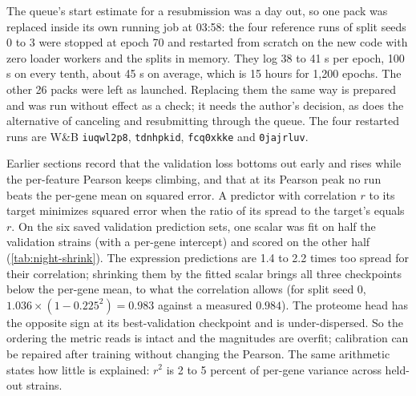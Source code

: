  The queue's start estimate for a resubmission was a day
out, so one pack was replaced inside its own running job at 03:58: the four reference runs
of split seeds 0 to 3 were stopped at epoch 70 and restarted from scratch on the new code
with zero loader workers and the splits in memory. They log 38 to 41 s per epoch, 100 s on
every tenth, about 45 s on average, which is 15 hours for 1{,}200 epochs. The other 26
packs were left as launched. Replacing them the same way is prepared and was run without
effect as a check; it needs the author's decision, as does the alternative of canceling and
resubmitting through the queue. The four restarted runs are W\&B \texttt{iuqwl2p8},
\texttt{tdnhpkid}, \texttt{fcq0xkke} and \texttt{0jajrluv}.

 Earlier sections
record that the validation loss bottoms out early and rises while the per-feature Pearson
keeps climbing, and that at its Pearson peak no run beats the per-gene mean on squared
error. A predictor with correlation $r$ to its target minimizes squared error when the ratio
of its spread to the target's equals $r$. On the six saved validation prediction sets, one
scalar was fit on half the validation strains (with a per-gene intercept) and scored on the
other half (\cref{tab:night-shrink}). The expression predictions are 1.4 to 2.2 times too
spread for their correlation; shrinking them by the fitted scalar brings all three
checkpoints below the per-gene mean, to what the correlation allows (for split seed 0,
$1.036 \times (1 - 0.225^2) = 0.983$ against a measured $0.984$). The proteome head has the
opposite sign at its best-validation checkpoint and is under-dispersed. So the ordering the
metric reads is intact and the magnitudes are overfit; calibration can be repaired after
training without changing the Pearson. The same arithmetic states how little is explained:
$r^2$ is 2 to 5 percent of per-gene variance across held-out strains.

\begin{table}[htbp]
  \centering
  \footnotesize
  \caption[]{\textbf{One scalar fit on half the validation strains brings every expression
  checkpoint below the per-gene mean on squared error.} NMSE is the squared error per gene
  over that gene's variance across the scoring strains, averaged over genes; 1 is the
  per-gene mean of the scoring strains, and the mean estimated on the fitting half reads
  above 1. Each row is a best-validation checkpoint (a selected epoch) of round v13 or v14;
  halves swapped and averaged. The lowest NMSE of each row is bold.}
  \label{tab:night-shrink}
  
\end{table}

